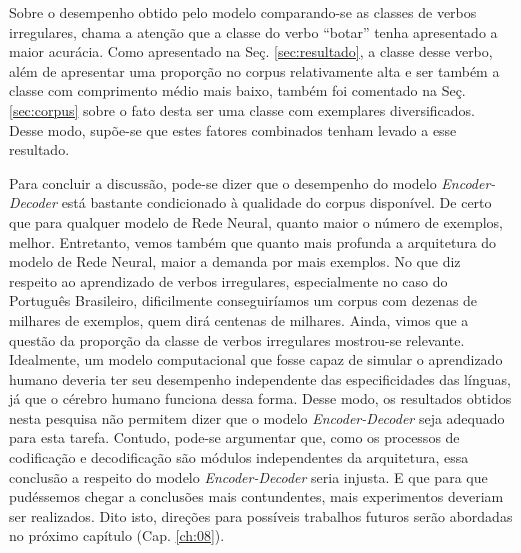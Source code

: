 Sobre o desempenho obtido pelo modelo comparando-se as classes de verbos irregulares, chama a atenção que a classe do verbo “botar” tenha apresentado a maior acurácia. Como apresentado na Seç. \ref{sec:resultado}, a classe desse verbo, além de apresentar uma proporção no corpus relativamente alta e ser também a classe com comprimento médio mais baixo, também foi comentado na Seç.\ref{sec:corpus} sobre o fato desta ser uma classe com exemplares diversificados. Desse modo, supõe-se que estes fatores combinados tenham levado a esse resultado. 

Para concluir a discussão, pode-se dizer que o desempenho do modelo \textit{Encoder-Decoder} está bastante condicionado à qualidade do corpus disponível. De certo que para qualquer modelo de Rede Neural, quanto maior o número de exemplos, melhor. Entretanto, vemos também que quanto mais profunda a arquitetura do modelo de Rede Neural, maior a demanda por mais exemplos. No que diz respeito ao aprendizado de verbos irregulares, especialmente no caso do Português Brasileiro, dificilmente conseguiríamos um corpus com dezenas de milhares de exemplos, quem dirá centenas de milhares. Ainda, vimos que a questão da proporção da classe de verbos irregulares mostrou-se relevante. Idealmente, um modelo computacional que fosse capaz de simular o aprendizado humano deveria ter seu desempenho independente das especificidades das línguas, já que o cérebro humano funciona dessa forma. Desse modo, os resultados obtidos nesta pesquisa não permitem dizer que o modelo \textit{Encoder-Decoder} seja adequado para esta tarefa. Contudo, pode-se argumentar que, como os processos de codificação e decodificação são módulos independentes da arquitetura, essa conclusão a respeito do modelo \textit{Encoder-Decoder} seria injusta. E que para que pudéssemos chegar a conclusões mais contundentes, mais experimentos deveriam ser realizados. Dito isto, direções para possíveis trabalhos futuros serão abordadas no próximo capítulo (Cap. \ref{ch:08}). 

  